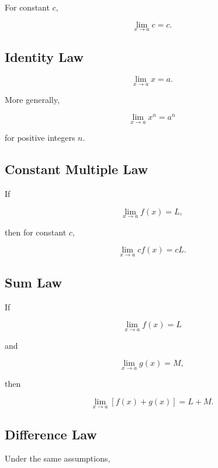 For constant \(c\),

\[
\boxed{
\lim_{x\to a}c
=
c.
}
\]

\subsection{Identity Law}
\label{subsec:identity-limit-law}

\[
\boxed{
\lim_{x\to a}x
=
a.
}
\]

More generally,

\[
\boxed{
\lim_{x\to a}x^n
=
a^n
}
\]

for positive integers \(n\).

\subsection{Constant Multiple Law}
\label{subsec:constant-multiple-limit-law}

If

\[
\lim_{x\to a}f(x)=L,
\]

then for constant \(c\),

\[
\boxed{
\lim_{x\to a}
cf(x)
=
cL.
}
\]

\subsection{Sum Law}
\label{subsec:sum-limit-law}

If

\[
\lim_{x\to a}f(x)=L
\]

and

\[
\lim_{x\to a}g(x)=M,
\]

then

\[
\boxed{
\lim_{x\to a}
[f(x)+g(x)]
=
L+M.
}
\]

\subsection{Difference Law}
\label{subsec:difference-limit-law}

Under the same assumptions,

